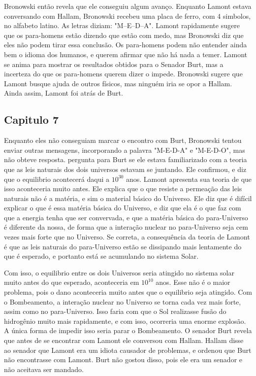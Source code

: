 \documentclass[14pt,portuguese]{extreport}
\begin{document}
    	  Bronowski então revela que ele conseguiu algum avanço. Enquanto Lamont estava conversando com Hallam, Bronowski recebeu uma placa de ferro, com 4 simbolos, no alfabeto latino. As letras diziam: "M–E–D–A". Lamont rapidamente sugere que os para-homens estão dizendo que estão com medo, mas Bronowski diz que eles não podem tirar essa conclusão. Os para-homens podem não entender ainda bem o idioma dos humanos, e querem afirmar que não há nada a temer. Lamont se anima para mostrar os resultados obtidos para o Senador Burt, mas a incerteza do que os para-homens querem dizer o impede. Bronowski sugere que Lamont busque ajuda de outros físicos, mas ninguém iria se opor a Hallam. Ainda assim, Lamont foi atrás de Burt.

      \subsection{Capitulo 7}

    	  Enquanto eles não conseguiam marcar o encontro com Burt, Bronowski tentou enviar outras mensagens, incorporando a palavra "M-E-D-A" e "M-E-D-O", mas não obteve resposta. pergunta para Burt se ele estava familiarizado com a teoria que as leis naturais dos dois universos estavam se juntando. Ele confirmou, e diz que o equilibrio acontecerá daqui a \(10^{30}\) anos. Lamont apresenta sua teoria de que isso aconteceria muito antes. Ele explica que o que resiste a permeação das leis naturais não é a matéria, e sim o material básico do Universo. Ele diz que é difícil explicar o que é essa matéria básica do Universo, e diz que ela é o que faz com que a energia tenha que ser convervada, e que a matéria básica do para-Universo é diferente da nossa, de forma que a interação nuclear no para-Universo seja cem vezes mais forte que no Universo. Se correta, a consequência da teoria de Lamont é que as leis naturais do para-Universo estão se dissipando mais lentamente do que é esperado, e portanto está se acumulando no sistema Solar. 

        Com isso, o equilibrio entre os dois Universos seria atingido no sistema solar muito antes do que esperado, aconteceria em \(10^{10}\) anos. Esse não é o maior problema, pois o dano aconteceria muito antes que o equilibrio seja atingido. Com o Bombeamento, a interação nuclear no Universo se torna cada vez mais forte, assim como no para-Universo. Isso faria com que o Sol realizasse fusão do hidrogênio muito mais rapidamente, e com isso, ocorreria uma enorme explosão. A única forma de impedir isso seria parar o Bombeamento. O senador Burt revela que antes de se encontrar com Lamont ele conversou com Hallam. Hallam disse ao senador que Lamont era um idiota causador de problemas, e ordenou que Burt não encontrasse com Lamont. Burt não gostou disso, pois ele era um senador e não aceitava ser mandado.
    	
\end{document}
